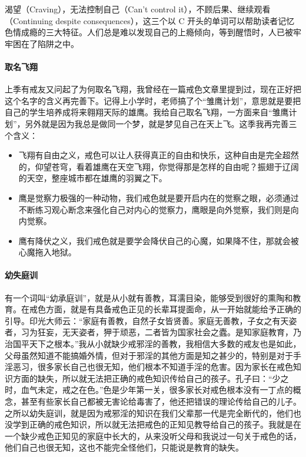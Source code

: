 渴望（Craving），无法控制自己（Can't control it），不顾后果、继续观看（Continuing despite consequences），这三个以 C 开头的单词可以帮助读者记忆色情成瘾的三大特征。人们总是难以发现自己的上瘾倾向，等到醒悟时，人已被牢牢困在了陷阱之中。

\paragraph{取名飞翔}

上季有戒友又问起了为何取名飞翔，我曾经在一篇戒色文章里提到过，现在正好把这个名字的含义再完善下。记得上小学时，老师搞了个“雏鹰计划”，意思就是要把自己的学生培养成将来翱翔天际的雄鹰。我给自己取名飞翔，一方面来自“雏鹰计划”，另外就是因为我总是做同一个梦，就是梦见自己在天上飞。这季我再完善三个含义：

\begin{itemize}
    \item 飞翔有自由之义，戒色可以让人获得真正的自由和快乐，这种自由是完全超然的，仰望苍穹，看着雄鹰在天空飞翔，你觉得那是怎样的自由呢？振翅于辽阔的天空，整座城市都在雄鹰的羽翼之下。
    \item 鹰是觉察力极强的一种动物，我们戒色就是要开启内在的觉察之眼，必须通过不断练习观心断念来强化自己对内心的觉察力，鹰眼是向外觉察，我们则是向内觉察。
    \item 鹰有降伏之义，我们戒色就是要学会降伏自己的心魔，如果降不住，那就会被心魔拖入地狱。
\end{itemize}

\paragraph{幼失庭训}

有一个词叫“幼承庭训”，就是从小就有善教，耳濡目染，能够受到很好的熏陶和教育。在戒色方面，就是有具备戒色正见的长辈耳提面命，从一开始就能给予正确的引导。印光大师云：“家庭有善教，自然子女皆贤善。家庭无善教，子女之有天姿者，习为狂妄，无天姿者，狎于顽恶，二者皆为国家社会之蠹。是知家庭教育，乃治国平天下之根本。”我从小就缺少戒邪淫的善教，我相信大多数的戒友也是如此，父母虽然知道不能搞婚外情，但对于邪淫的其他方面是知之甚少的，特别是对于手淫恶习，很多家长自己也很无知，他们根本不知道手淫的危害。因为家长在戒色知识方面的缺失，所以就无法把正确的戒色知识传给自己的孩子。孔子曰：“少之时，血气未定，戒之在色。”色是少年第一关，很多家长对戒色根本没有一丁点的概念，甚至有些家长自己都被无害论给毒害了，他还把错误的理论传给自己的儿子。之所以幼失庭训，就是因为戒邪淫的知识在我们父辈那一代是完全断代的，他们也没学到正确的戒色知识，所以就无法把戒色的正知见教导给自己的孩子。我就是在一个缺少戒色正知见的家庭中长大的，从来没听父母和我说过一句关于戒色的话，他们自己也很无知，这也不能完全怪他们，只能说是教育的缺失。

